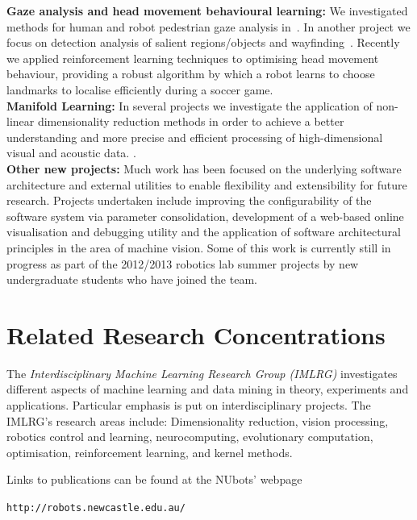 \documentclass{llncs}
\begin{document}
\noindent\textbf{Gaze analysis and head movement behavioural learning:} We investigated methods for human and robot pedestrian gaze analysis in~\cite{JalalianEtAl_CAADRIA2011,WongEtAl2012}. In another project we focus on detection analysis of salient regions/objects and wayfinding~\cite{BhatiaEtAl2012}. Recently we  applied reinforcement learning techniques to optimising head movement behaviour, providing a robust algorithm by which a robot learns to choose landmarks to localise efficiently during a soccer game. 
\\

\noindent\textbf{Manifold Learning:} In several projects we
investigate the application of non-linear dimensionality reduction
methods in order to achieve a better understanding and more precise
and efficient processing of high-dimensional visual and acoustic data.
\cite{ChalupEtAl2007b,WongChalup_WCCI_2008,WongChalup2008,WongEtAl2012}.
\\

\noindent\textbf{Other new projects:} Much work has been focused on the underlying software architecture and external utilities to enable flexibility and extensibility for future research. Projects undertaken include improving the configurability of the software system via parameter consolidation, development of a web-based online visualisation and debugging utility and the application of software architectural principles in the area of machine vision. Some of this work is currently still in progress as part of the 2012/2013 robotics lab summer projects by new undergraduate students who have joined the team.

\section{Related Research Concentrations}

The \emph{Interdisciplinary Machine Learning Research Group (IMLRG)} investigates different aspects of machine learning and data mining in theory, experiments and applications. Particular emphasis is put on interdisciplinary projects. The IMLRG's research areas include: Dimensionality reduction, vision processing, robotics control and learning, neurocomputing, evolutionary computation, optimisation, reinforcement learning, and kernel methods.

\noindent Links to publications can be found at the NUbots' webpage
\begin{center}
\texttt{http://robots.newcastle.edu.au/}
\end{center}
\end{document}

